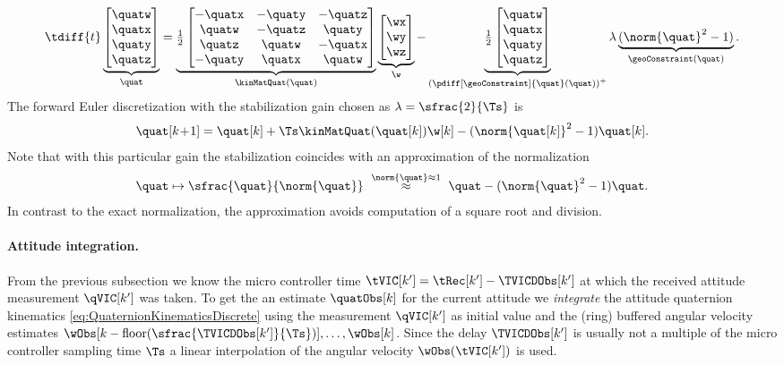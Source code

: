\begin{align}\label{eq:QuaternionKinematics}
 \tdiff{t} \underbrace{\begin{bmatrix} \quatw \\ \quatx \\ \quaty \\ \quatz \end{bmatrix}}_{\quat}
 = \underbrace{\tfrac{1}{2} \begin{bmatrix} -\quatx & -\quaty & -\quatz \\ \quatw & -\quatz & \quaty \\ \quatz & \quatw & -\quatx \\ -\quaty & \quatx & \quatw \end{bmatrix}}_{\kinMatQuat(\quat)}
 \underbrace{\begin{bmatrix} \wx \\ \wy \\ \wz \end{bmatrix}}_{\w}
 -
 \underbrace{\tfrac{1}{2} \begin{bmatrix} \quatw \\ \quatx \\ \quaty \\ \quatz \end{bmatrix}}_{\left(\pdiff[\geoConstraint]{\quat}(\quat)\right)^+}
 \lambda\underbrace{(\norm{\quat}^2 - 1)}_{\geoConstraint(\quat)}
 .
\end{align}
The forward Euler discretization with the stabilization gain chosen as $\lambda=\sfrac{2}{\Ts}$ is
\begin{align}\label{eq:QuaternionKinematicsDiscrete}
 \quat[k\!+\!1] = \quat[k] + \Ts \kinMatQuat(\quat[k]) \w[k] - (\norm{\quat[k]}^2-1) \quat[k].
\end{align}
Note that with this particular gain the stabilization coincides with an approximation of the normalization
\begin{align*}
 \quat \mapsto \sfrac{\quat}{\norm{\quat}} \ \overset{\norm{\quat} \approx 1}{\approx} \ \quat - (\norm{\quat}^2-1) \quat.
\end{align*}
In contrast to the exact normalization, the approximation avoids computation of a square root and division.

\paragraph{Attitude integration.}
From the previous subsection we know the micro controller time $\tVIC[k'] = \tRec[k'] - \TVICDObs[k']$ at which the received attitude measurement $\qVIC[k']$ was taken.
To get the an estimate $\quatObs[k]$ for the current attitude we \textit{integrate} the attitude quaternion kinematics \eqref{eq:QuaternionKinematicsDiscrete} using the measurement $\qVIC[k']$ as initial value and the (ring) buffered angular velocity estimates $\wObs[k-\text{floor}(\sfrac{\TVICDObs[k']}{\Ts})],\ldots, \wObs[k]$.
Since the delay $\TVICDObs[k']$ is usually not a multiple of the micro controller sampling time $\Ts$ a linear interpolation of the angular velocity $\wObs(\tVIC[k'])$ is used.


